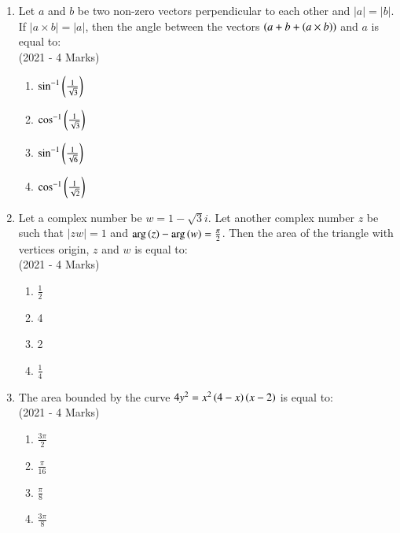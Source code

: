 \documentclass[journal]{IEEEtran}
\begin{document}
\begin{enumerate}
{        }
    \item{
        	Let $a$ and $b$ be two non-zero vectors perpendicular to each other and $|a| = |b|$. If $|a \times b| = |a|$, then the angle between the vectors $\left(a + b + \left(a \times b\right)\right)$ and $a$ is equal to:\\
             \text{   }\hfill
                {(2021 - 4 Marks)}
				\begin{multicols}{4}
	                \begin{enumerate}
	                   	\item $\sin^{-1}\left(\frac{1}{\sqrt{3}}\right)$
	                   	\item $\cos^{-1}\left(\frac{1}{\sqrt{3}}\right)$
	                   	\item $\sin^{-1}\left(\frac{1}{\sqrt{6}}\right)$
	                   	\item $\cos^{-1}\left(\frac{1}{\sqrt{2}}\right)$
	                \end{enumerate}
				\end{multicols}
        
        }
    \item{
	
			Let a complex number be $w = 1 - \sqrt{3}i$. Let another complex number $z$ be such that $|zw| = 1$ and $\arg\left(z\right) - \arg\left(w\right) = \frac{\pi}{2}$. Then the area of the triangle with vertices origin, $z$ and $w$ is equal to:\\
			\text{   }\hfill
			{(2021 - 4 Marks)}
			\begin{multicols}{4}
				\begin{enumerate}
						\item $\frac{1}{2}$
						\item 4
						\item 2
						\item $\frac{1}{4}$
				\end{enumerate}
			\end{multicols}
			
		}
    \item{
	
			The area bounded by the curve $4y^2 = x^2 \left(4 - x\right)\left(x - 2\right)$ is equal to:\\
			\text{   }\hfill
			{(2021 - 4 Marks)}
			\begin{multicols}{4}
				\begin{enumerate}
					\item $\frac{3\pi}{2}$
					\item $\frac{\pi}{16}$
					\item $\frac{\pi}{8}$
					\item $\frac{3\pi}{8}$
				\end{enumerate}
			\end{multicols}
			
}
\end{enumerate}
\end{document}
